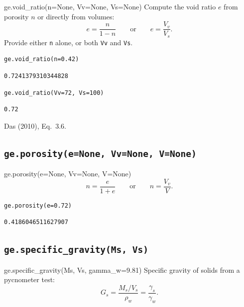 \documentclass[11pt,a4paper,openany]{book}
\begin{document}
\begin{funcbox}{ge.void\_ratio(n=None, Vv=None, Vs=None)}
Compute the void ratio $e$ from porosity $n$ or directly from
volumes:
\[
e = \frac{n}{1 - n} \qquad\text{or}\qquad e = \frac{V_v}{V_s}.
\]
Provide either \texttt{n} alone, or both \texttt{Vv} and \texttt{Vs}.
\end{funcbox}

\begin{lstlisting}
ge.void_ratio(n=0.42)
\end{lstlisting}
\begin{lstlisting}[style=output]
0.7241379310344828
\end{lstlisting}

\begin{lstlisting}
ge.void_ratio(Vv=72, Vs=100)
\end{lstlisting}
\begin{lstlisting}[style=output]
0.72
\end{lstlisting}

\begin{refbox}
Das (2010), Eq.~3.6.
\end{refbox}

\subsection{\texttt{ge.porosity(e=None, Vv=None, V=None)}}

\begin{funcbox}{ge.porosity(e=None, Vv=None, V=None)}
\[
n = \frac{e}{1 + e} \qquad\text{or}\qquad n = \frac{V_v}{V}.
\]
\end{funcbox}

\begin{lstlisting}
ge.porosity(e=0.72)
\end{lstlisting}
\begin{lstlisting}[style=output]
0.4186046511627907
\end{lstlisting}

\subsection{\texttt{ge.specific\_gravity(Ms, Vs)}}

\begin{funcbox}{ge.specific\_gravity(Ms, Vs, gamma\_w=9.81)}
Specific gravity of solids from a pycnometer test:
\[
G_s = \frac{M_s / V_s}{\rho_w} = \frac{\gamma_s}{\gamma_w}.
\]
\end{funcbox}
\end{document}
